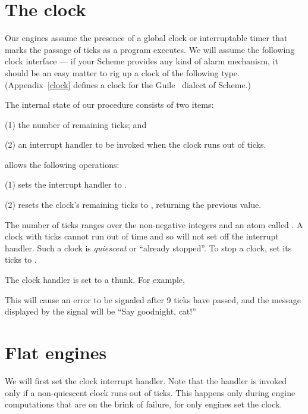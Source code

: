 
\section{The clock}
\label{engine-clock}

Our engines assume the presence of a global clock or
interruptable timer that marks the passage of ticks as
a program executes.  We will assume the following clock
interface — if your Scheme provides any kind of alarm
mechanism, it should be an easy matter to rig up a
clock of the following type. (Appendix~\ref{clock}
defines a clock for the Guile~\cite{guile} dialect of
Scheme.)

The internal state of our  procedure consists
of two items:

(1) the number of remaining ticks; and

(2) an interrupt handler to be invoked when the
clock runs out of ticks.

 allows the following operations:

(1)  sets the
interrupt handler to .

(2)  resets the clock’s
remaining ticks to , returning the
previous value.

The number of ticks ranges over the non-negative
integers and an atom called .  A clock with
 ticks cannot run out of time and so will
not set off the interrupt handler.  Such a clock is
{\em quiescent} or “already stopped”.  To stop a
clock, set its ticks to .

The clock handler is set to a thunk.  For example,


\n This will cause an error to be signaled after 9
ticks have passed, and the message displayed by the
signal will be “Say goodnight, cat!”

\section{Flat engines}

We will first set the clock interrupt handler.  Note
that the handler is invoked only if a non-quiescent
clock runs out of ticks.  This happens only during
engine computations that are on the brink of failure,
for only engines set the clock.

